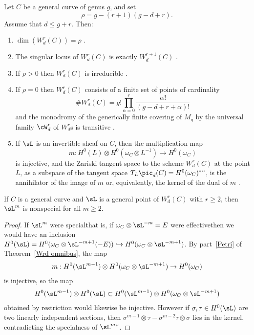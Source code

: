 \begin{theorem}\label{Wrd omnibus}
Let $C$ be a general curve of genus $g$,
and set
$$\rho = g - (r+1)(g-d+r).$$ 
Assume that $d \leq g+r$. Then:
\begin{enumerate}

\item $\dim(W^r_d(C)) = \rho$ 
{\rm\cite{Griffiths-Harris-BN}}.
\label{GH}

\item\label{sing wrd} The singular locus of $W^r_d(C)$ is exactly
$W^{r+1}_d(C)$
{\rm\cite{Gieseker-Petri,Lazarsfeld-Petri}}.
\label{irr wrd}

\item If $\rho > 0$ then $W^r_d(C)$ is irreducible 
%
%
%
{\rm\cite{MR611386}}.

\item\label{rho=0} If $\rho = 0$ then $W^r_d(C)$ consists of a finite
set of  points of cardinality
$$
\#W^r_d(C) = g! \prod_{\alpha=0}^r \frac{\alpha!}{(g-d+r+\alpha)!}
$$
and the monodromy of the generically finite covering of  $M_g$ by the
universal family
$\cW^r_d$ of $W^r_d$s is transitive
{\rm\cite{zbMATH04014883}}.

\item\label{Petri} If  $\sL$ is an invertible sheaf on $C$, then the
multiplication map
$$
m : H^0(L) \otimes H^0(\omega_C\otimes L^{-1}) \to H^0(\omega_C)
$$
is injective, and the Zariski tangent space to the scheme $W^r_d(C)$
at the point $L$, as a subspace
of the tangent space $T_L\pic_d(C) = H^0(\omega_C)^*` `$, is the
annihilator of the image of $m$
or, equivalently, the kernel of the dual of $m$ 
{\rm\cite{Gieseker-Petri}}.
\end{enumerate}
\end{theorem}

\begin{corollary}\label{2L nonspecial}
If $C$ is a general curve and $\sL$ is a general point of $W^r_d(C)$
with $r\geq 2$,
 then $\sL^m$ is nonspecial for all $m \geq 2$.
%
\end{corollary}

\begin{proof}
If $\sL^m$ were special\emdash that is, if $\omega_C\otimes \sL^{-m}
= E$ were effective\emdash then we would have an inclusion $H^0(\sL) =
H^0(\omega_C\otimes \sL^{-m+1}(-E)) \hookrightarrow H^0(\omega_C\otimes
\sL^{-m+1})$. By part~\ref{Petri} of Theorem~\ref{Wrd omnibus}, the map
 $$
m : H^0(\sL^{m-1}) \otimes H^0(\omega_C\otimes \sL^{-m+1}) \to
H^0(\omega_C)
$$
is injective, so the map
$$
H^0(\sL^{m-1}) \otimes H^0(\sL) \subset H^0(\sL^{m-1}) \otimes
H^0(\omega_C\otimes \sL^{-m+1})
$$
obtained by restriction would likewise be injective.
However if $\sigma, \tau \in H^0(\sL)$ are two linearly independent
sections, then $\sigma^{m-1} \otimes \tau - \sigma^{m-2}\tau \otimes
\sigma$ lies in the kernel, contradicting the specialness of $\sL^m` `$.
\end{proof}

